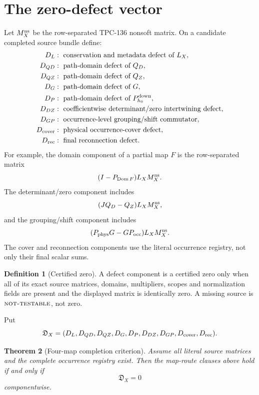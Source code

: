 \documentclass[11pt]{article}
\newtheorem{theorem}{Theorem}[section]
\theoremstyle{definition}
\newtheorem{definition}[theorem]{Definition}
\theoremstyle{remark}
\newcommand{\NT}{\textnormal{\textsc{not-testable}}}
\begin{document}
\section{The zero-defect vector}

Let \(M_X^{\rm ns}\) be the row-separated TPC-136 nonsoft matrix.  On
a candidate completed source bundle define:
\begin{align*}
D_L&:\ \text{conservation and metadata defect of }L_X,\\
D_{QD}&:\ \text{path-domain defect of }Q_D,\\
D_{QZ}&:\ \text{path-domain defect of }Q_Z,\\
D_G&:\ \text{path-domain defect of }G,\\
D_P&:\ \text{path-domain defect of }P_{h_0}^{\rm down},\\
D_{DZ}&:\ \text{coefficientwise determinant/zero intertwining defect},\\
D_{GP}&:\ \text{occurrence-level grouping/shift commutator},\\
D_{\rm cover}&:\ \text{physical occurrence-cover defect},\\
D_{\rm rec}&:\ \text{final reconnection defect}.
\end{align*}
For example, the domain component of a partial map \(F\) is the
row-separated matrix
\[
 (I-P_{\operatorname{Dom}F})L_XM_X^{\rm ns}.
\]
The determinant/zero component includes
\[
 (JQ_D-Q_Z)L_XM_X^{\rm ns},
\]
and the grouping/shift component includes
\[
 (P_{\rm phys}G-GP_{\rm occ})L_XM_X^{\rm ns}.
\]
The cover and reconnection components use the literal occurrence
registry, not only their final scalar sums.

\begin{definition}[Certified zero]
A defect component is a certified zero only when all of its exact
source matrices, domains, multipliers, scopes and normalization fields
are present and the displayed matrix is identically zero.  A missing
source is \(\NT\), not zero.
\end{definition}

Put
\begin{equation}
 \mathfrak D_X=
 (D_L,D_{QD},D_{QZ},D_G,D_P,D_{DZ},D_{GP},
 D_{\rm cover},D_{\rm rec}).
 \label{eq:defectvector}
\end{equation}

\begin{theorem}[Four-map completion criterion]
\label{thm:criterion}
Assume all literal source matrices and the complete occurrence
registry exist.  Then the map-route clauses above hold if and only if
\[
 \boxed{\mathfrak D_X=0}
 \label{eq:zero}
\]
componentwise.
\end{theorem}
\end{document}
